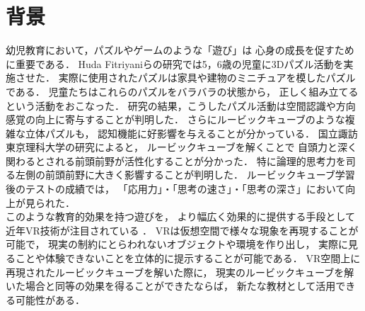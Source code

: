 \section{背景}
  幼児教育において，パズルやゲームのような「遊び」は
  心身の成長を促すために重要である\cite{joy}．
  Huda Fitriyaniらの研究\cite{puzzle}では5，6歳の児童に3Dパズル活動を実施させた．
  実際に使用されたパズルは家具や建物のミニチュアを模したパズルである．
  児童たちはこれらのパズルをバラバラの状態から，
  正しく組み立てるという活動をおこなった．
  研究の結果，こうしたパズル活動は空間認識や方向感覚の向上に寄与することが判明した．
  さらにルービックキューブのような複雑な立体パズルも，
  認知機能に好影響を与えることが分かっている．
  国立諏訪東京理科大学の研究\cite{rubik}によると，
  ルービックキューブを解くことで
  自頭力と深く関わるとされる前頭前野が活性化することが分かった．
  特に論理的思考力を司る左側の前頭前野に大きく影響することが判明した．
  ルービックキューブ学習後のテストの成績では，
  「応用力」・「思考の速さ」・「思考の深さ」において向上が見られた．
  \\\indent
  このような教育的効果を持つ遊びを，
  より幅広く効果的に提供する手段として近年VR技術が注目されている
  \cite{全天球}\cite{授業実践}．
  VRは仮想空間で様々な現象を再現することが可能で，
  現実の制約にとらわれないオブジェクトや環境を作り出し，
  実際に見ることや体験できないことを立体的に提示することが可能である．
  VR空間上に再現されたルービックキューブを解いた際に，
  現実のルービックキューブを解いた場合と同等の効果を得ることができたならば，
  新たな教材として活用できる可能性がある．
